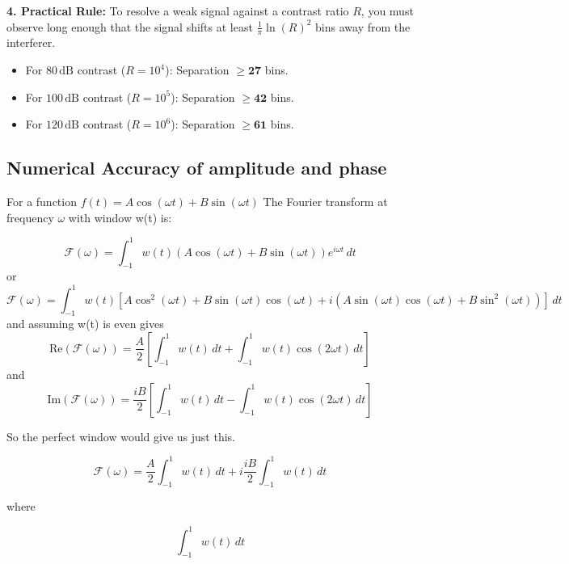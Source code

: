\documentclass[11pt]{article}
\theoremstyle{breakdef}
\begin{document}
\noindent \textbf{4. Practical Rule:} To resolve a weak signal against a contrast ratio $R$, you must observe long enough that the signal shifts at least $\frac{1}{\pi} \ln(R)^2$ bins away from the interferer.
\begin{itemize}
    \item For $80\,\text{dB}$ contrast ($R=10^4$): Separation $\ge \mathbf{27}$ bins.
    \item For $100\,\text{dB}$ contrast ($R=10^5$): Separation $\ge \mathbf{42}$ bins.
    \item For $120\,\text{dB}$ contrast ($R=10^6$): Separation $\ge \mathbf{61}$ bins.
\end{itemize}

\subsection{Numerical Accuracy of amplitude and phase}
For a function $f(t) = A \cos(\omega t) + B \sin(\omega t)$
The Fourier transform at frequency $\omega$  with window w(t) is:

\begin{equation}
\mathcal{F}(\omega) = \int_{-1}^{1} w(t) \left( A \cos(\omega t) + B \sin(\omega t) \right) e^{i \omega t} \, dt
\end{equation}
or
\begin{equation}
\mathcal{F}(\omega) = \int_{-1}^{1} w(t) [A \cos^2(\omega t) + B \sin(\omega t) \cos(\omega t) + i (A \sin(\omega t) \cos(\omega t) + B \sin^2(\omega t))] \, dt
\end{equation}
and assuming w(t) is even gives
\begin{equation}
\text{Re}(\mathcal{F(\omega)}) = \frac{A}{2} \left[ \int_{-1}^{1} w(t) \, dt + \int_{-1}^{1} w(t) \cos(2\omega t) \, dt \right]
\end{equation}
and
\begin{equation}
\text{Im}(\mathcal{F(\omega)}) = \frac{i B}{2} \left[ \int_{-1}^{1} w(t) \, dt - \int_{-1}^{1} w(t) \cos(2\omega t) \, dt \right]
\end{equation}

So the perfect window would give us just this.

\begin{equation}
\mathcal{F(\omega)} = \frac{A}{2} \int_{-1}^{1} w(t) \, dt + i \frac{i B}{2}  \int_{-1}^{1} w(t) \, dt 
\end{equation}

where 

\begin{equation}
\int_{-1}^{1} w(t) \, dt
\end{equation}
\end{document}
